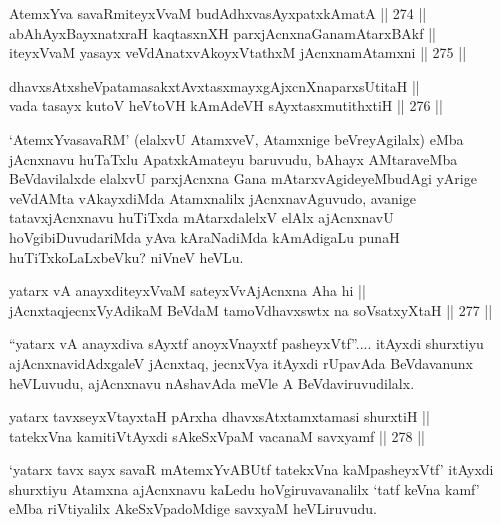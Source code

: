\begin{shl}
AtemxYva savaRmiteyxVvaM budAdhxvasAyx\s \s patxkAmatA \hfill || 274 ||  \\
abAhAyxBayxnatxraH kaqtasxnXH parxjAcnxnaGanamAtarxBAkf || \\
iteyxVvaM yasayx veVdAnatxvAkoyxVtathxM jAcnxnamAtamxni \hfill || 275 ||  
\end{shl}

\begin{shl}
dhavxsAtxsheVpatamasakxtAvxtasxmayxgAjxcnXnaparxsUtitaH || \\
vada tasayx kutoV heVtoVH kAmAdeVH sAyxtasxmutithxtiH \hfill || 276 ||  
\end{shl}

\begin{artha}
`AtemxYvasavaRM' (elalxvU AtamxveV, Atamxnige beVreyAgilalx) eMba
jAcnxnavu huTaTxlu ApatxkAmateyu baruvudu, bAhayx AMtaraveMba
BeVdavilalxde elalxvU parxjAcnxna Gana mAtarxvAgideyeMbudAgi yArige
veVdAMta vAkayxdiMda Atamxnalilx jAcnxnavAguvudo, avanige
tatavxjAcnxnavu huTiTxda mAtarxdalelxV elAlx ajAcnxnavU
hoVgibiDuvudariMda yAva kAraNadiMda kAmAdigaLu punaH
huTiTxkoLaLxbeVku? niVneV heVLu.
\end{artha}


\begin{shl}
yatarx vA anayxditeyxVvaM sateyxVvAjAcnxna Aha hi || \\
jAcnxtaqjecnxVyAdikaM BeVdaM tamoVdhavxswtx na soV\s satxyXtaH \hfill || 277 || 
\end{shl}

\begin{artha}
``yatarx vA anayxdiva sAyxtf anoyxV\s nayxtf pasheyxVtf''.... itAyxdi shurxtiyu ajAcnxnavidAdxgaleV jAcnxtaq, jecnxVya
itAyxdi rUpavAda BeVdavanunx heVLuvudu, ajAcnxnavu nAshavAda meVle A BeVdaviruvudilalx.
\end{artha}


\begin{shl}
yatarx tavxseyxVtayxtaH pArxha dhavxsAtxtamxtamasi shurxtiH || \\
tatekxVna kamitiVtAyxdi sAkeSxVpaM vacanaM savxyamf \hfill || 278 ||   
\end{shl}

\begin{artha}
`yatarx tavx sayx savaR mAtemxYvABUtf tatekxVna kaMpasheyxVtf' itAyxdi shurxtiyu Atamxna ajAcnxnavu kaLedu hoVgiruvavanalilx
`tatf keVna kamf' eMba riVtiyalilx AkeSxVpadoMdige savxyaM heVLiruvudu.
\end{artha}

